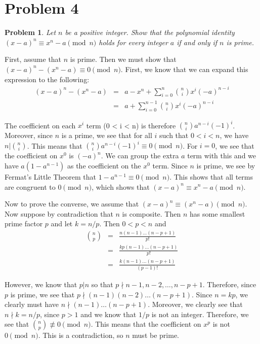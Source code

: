 \documentclass[psamsfonts]{amsart}
\newtheorem{prob}{Problem}[section]
\newenvironment{sol}{{\bfseries Solution}}{\qedsymbol}
\theoremstyle{definition}
\theoremstyle{remark}
\numberwithin{equation}{section}
\begin{document}
\section{Problem 4}

\begin{prob}
Let $n$ be a positive integer. Show that the polynomial identity $(x - a)^n \equiv x^n - a \pmod{n}$ holds for every integer $a$ if and only if $n$ is prime.
\end{prob}

\begin{sol}
First, assume that $n$ is prime. Then we must show that $(x-a)^n - (x^n - a) \equiv 0 \pmod{n}$. First, we know that we can expand this expression to the following:
\begin{eqnarray}
(x-a)^n - (x^n - a) &=& a - x^n + \sum_{i=0}^n {n \choose i} x^{i} (-a)^{n - i} \\
&=& a + \sum_{i=0}^{n-1} {n \choose i} x^i (-a)^{n-i}
\end{eqnarray}

The coefficient on each $x^i$ term (0 < i < n) is therefore ${n \choose i} a^{n - i} (-1)^i$. Moreover, since $n$ is a prime, we see that for all $i$ such that $0 < i < n$, we have $n | {n \choose i}$.  This means that ${n \choose i} a^{n - i} (-1)^i \equiv 0 \pmod{n}$. For $i = 0$, we see that the coefficient on $x^0$ is $(-a)^n$. We can group the extra $a$ term with this and we have $a(1 - a^{n-1})$ as the coefficient on the $x^0$ term. Since $n$ is prime, we see by Fermat's Little Theorem that $1 - a^{n-1} \equiv 0 \pmod{n}$. This shows that all terms are congruent to $0 \pmod{n}$, which shows that $(x-a)^{n} \equiv x^n - a \pmod{n}$.  


Now to prove the converse, we assume that $(x-a)^n \equiv (x^n - a) \pmod{n}$. Now suppose by contradiction that $n$ is composite. Then $n$ has some smallest prime factor $p$ and let $k = n/p$. Then $0 < p < n$ and 
\begin{eqnarray}
{n \choose p} &=& \frac{n (n-1) \ldots (n - p + 1)}{p!} \\
&=& \frac{kp (n-1) \ldots( n - p + 1)}{p!} \\
&=& \frac{k (n-1) \ldots (n - p + 1)}{(p-1)!}
\end{eqnarray}

However, we know that $p | n$ so that $p \nmid n-1, n-2, \ldots, n - p + 1$. Therefore, since $p$ is prime, we see that $p \nmid (n-1)(n-2) \ldots (n-p+1)$. Since $n = kp$, we clearly must have $n \nmid (n-1) \ldots (n - p + 1)$. Moreover, we clearly see that $n \nmid k = n/p$, since $p > 1$ and we know that $1/p$ is not an integer. Therefore, we see that ${n \choose p} \not \equiv 0 \pmod{n}$. This means that the coefficient on $x^p$ is not $0 \pmod{n}$. This is a contradiction, so $n$ must be prime.

\end{sol}
\end{document}
